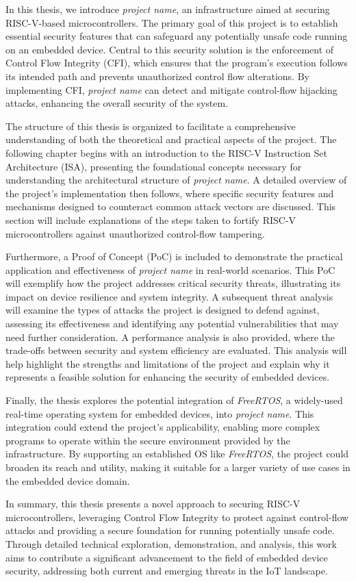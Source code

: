 In this thesis, we introduce \textit{project name}, an infrastructure aimed at securing
RISC-V-based microcontrollers. The primary goal of this project is to establish
essential security features that can safeguard any potentially unsafe code
running on an embedded device. Central to this security solution is the enforcement
of Control Flow Integrity (CFI), which ensures that the program's execution
follows its intended path and prevents unauthorized control flow alterations. By
implementing CFI, \textit{project name} can detect and mitigate control-flow hijacking
attacks, enhancing the overall security of the system.

The structure of this thesis is organized to facilitate a comprehensive
understanding of both the theoretical and practical aspects of the project. The following
chapter begins with an introduction to the RISC-V Instruction Set Architecture (ISA),
presenting the foundational concepts necessary for understanding the
architectural structure of \textit{project name}. A detailed overview of the
project's implementation then follows, where specific security features and mechanisms
designed to counteract common attack vectors are discussed. This section will
include explanations of the steps taken to fortify RISC-V microcontrollers
against unauthorized control-flow tampering.

Furthermore, a Proof of Concept (PoC) is included to demonstrate the practical application
and effectiveness of \textit{project name} in real-world scenarios. This PoC will
exemplify how the project addresses critical security threats, illustrating its
impact on device resilience and system integrity. A subsequent threat analysis will
examine the types of attacks the project is designed to defend against,
assessing its effectiveness and identifying any potential vulnerabilities that
may need further consideration. A performance analysis is also provided, where
the trade-offs between security and system efficiency are evaluated. This analysis
will help highlight the strengths and limitations of the project and explain why
it represents a feasible solution for enhancing the security of embedded devices.

Finally, the thesis explores the potential integration of \textit{FreeRTOS}, a
widely-used real-time operating system for embedded devices, into \textit{project
name}. This integration could extend the project's applicability, enabling more
complex programs to operate within the secure environment provided by the
infrastructure. By supporting an established OS like \textit{FreeRTOS}, the project
could broaden its reach and utility, making it suitable for a larger variety of
use cases in the embedded device domain.

In summary, this thesis presents a novel approach to securing RISC-V microcontrollers,
leveraging Control Flow Integrity to protect against control-flow attacks and
providing a secure foundation for running potentially unsafe code. Through detailed
technical exploration, demonstration, and analysis, this work aims to contribute
a significant advancement to the field of embedded device security, addressing both
current and emerging threats in the IoT landscape.